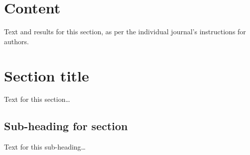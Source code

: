 \documentclass[twocolumn]{bmcart}%
\begin{document}
\begin{frontmatter}
\begin{fmbox}
\begin{abstractbox}
    \begin{keyword}
    \end{keyword}


  \end{abstractbox}
  \end{fmbox}%

\end{frontmatter}



\section*{Content}
Text and results for this section, as per the individual journal's instructions for authors.

\section*{Section title}
Text for this section\ldots
\subsection*{Sub-heading for section}
Text for this sub-heading\ldots
\end{document}

